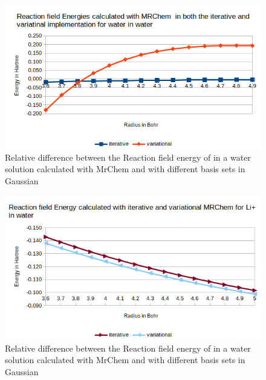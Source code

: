 \documentclass[../master_thesis.tex]{subfiles}
\begin{document}
\begin{figure}[h!]
  \centering
  \includegraphics[width=0.75\linewidth]{img/watvarEr.png}
  \caption{Relative difference between the Reaction field energy of  in a water solution calculated with MrChem
  and with different basis sets in Gaussian}
  \label{fig:watvarErb}
\end{figure}

\begin{figure}[h!]
  \centering
  \includegraphics[width=0.75\linewidth]{img/lipvarEr.png}
  \caption{Relative difference between the Reaction field energy of  in a water solution calculated with MrChem
  and with different basis sets in Gaussian}
  \label{fig:lipvarErb}
\end{figure}
\end{document}
